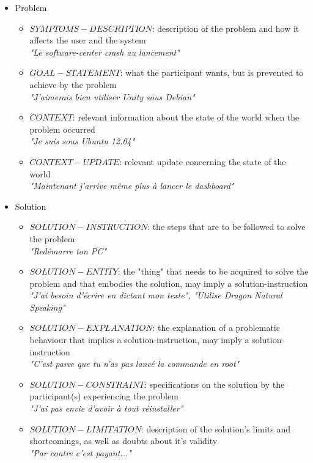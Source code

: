 \begin{itemize}
	\item Problem
		\begin{itemize}
			\item $SYMPTOMS-DESCRIPTION$: description of the problem and how it affects the user and the system\\
			\textit{"Le software-center crash au lancement"}
			\item $GOAL-STATEMENT$: what the participant wants, but is prevented to achieve by the problem\\
			\textit{"J'aimerais bien utiliser Unity sous Debian"}
			\item $CONTEXT$: relevant information about the state of the world when the problem occurred\\
			\textit{"Je suis sous Ubuntu 12.04"}
			\item $CONTEXT-UPDATE$: relevant update concerning the state of the world\\
			\textit{"Maintenant j'arrive même plus à lancer le dashboard"}
		\end{itemize}
	\item Solution
		\begin{itemize}
			\item $SOLUTION-INSTRUCTION$: the steps that are to be followed to solve the problem\\
			\textit{"Redémarre ton PC"}
			\item $SOLUTION-ENTITY$: the "thing" that needs to be acquired to solve the problem and that embodies the solution, may imply a solution-instruction\\
			\textit{"J'ai besoin d'écrire en dictant mon texte", "Utilise Dragon Natural Speaking"}\\
			\item $SOLUTION-EXPLANATION$: the explanation of a problematic behaviour that implies a solution-instruction, may imply a solution-instruction\\
			\textit{"C'est parce que tu n'as pas lancé la commande en root"}\\
			\item $SOLUTION-CONSTRAINT$: specifications on the solution by the participant(s) experiencing the problem\\
			\textit{"J'ai pas envie d'avoir à tout réinstaller"}
			\item $SOLUTION-LIMITATION$: description of the solution's limits and shortcomings, as well as doubts about it's validity\\
			\textit{"Par contre c'est payant..."}
		\end{itemize}
\end{itemize}

